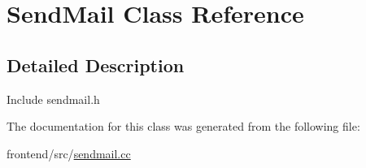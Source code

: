 \hypertarget{classSendMail}{\section{Send\-Mail Class Reference}
\label{classSendMail}
}


\subsection{Detailed Description}
Include sendmail.\-h 

The documentation for this class was generated from the following file\-:\begin{DoxyCompactItemize}
\item 
frontend/src/\hyperlink{sendmail_8cc}{sendmail.\-cc}\end{DoxyCompactItemize}
